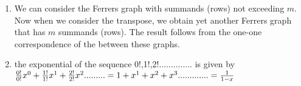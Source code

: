 \documentclass[a4paper]{article}
\begin{document}
\begin{enumerate}
\item We can consider the Ferrers graph with summands (rows) not exceeding $m$. Now when we consider the transpose, we obtain yet another Ferrers graph that has $m$ summands (rows). The result follows from the one-one correspondence of the between these graphs. 

\item the exponential of the sequence 0!,1!,2!.............. is given by
\begin {math} \frac{0!}{0!}   x^{0}+\frac{1!}{1!}   x^{1}+\frac{2!}{2!}   x^{2}......... 
 \\=1+  x^1+  x^2+  x^3............. = \frac{1}{1-x}
\end {math}

\end{enumerate}
\end{document}
